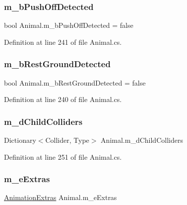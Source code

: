 \subsubsection{\texorpdfstring{m\+\_\+b\+Push\+Off\+Detected}{m\_bPushOffDetected}}
{\footnotesize\ttfamily bool Animal.\+m\+\_\+b\+Push\+Off\+Detected = false\hspace{0.3cm}{\ttfamily [protected]}}



Definition at line 241 of file Animal.\+cs.

\mbox{\label{class_animal_a34c35ef0f61aefb64431cc04c82b5054}} 
\subsubsection{\texorpdfstring{m\+\_\+b\+Rest\+Ground\+Detected}{m\_bRestGroundDetected}}
{\footnotesize\ttfamily bool Animal.\+m\+\_\+b\+Rest\+Ground\+Detected = false\hspace{0.3cm}{\ttfamily [protected]}}



Definition at line 240 of file Animal.\+cs.

\mbox{\label{class_animal_a7cc77366452cd8d15d5623dc2b368fee}} 
\subsubsection{\texorpdfstring{m\+\_\+d\+Child\+Colliders}{m\_dChildColliders}}
{\footnotesize\ttfamily Dictionary$<$Collider, Type$>$ Animal.\+m\+\_\+d\+Child\+Colliders\hspace{0.3cm}{\ttfamily [protected]}}



Definition at line 251 of file Animal.\+cs.

\mbox{\label{class_animal_a3e903279d776c821c7e699847fe06cf5}} 
\subsubsection{\texorpdfstring{m\+\_\+e\+Extras}{m\_eExtras}}
{\footnotesize\ttfamily \mbox{\hyperlink{class_animation_extras}{Animation\+Extras}} Animal.\+m\+\_\+e\+Extras}



